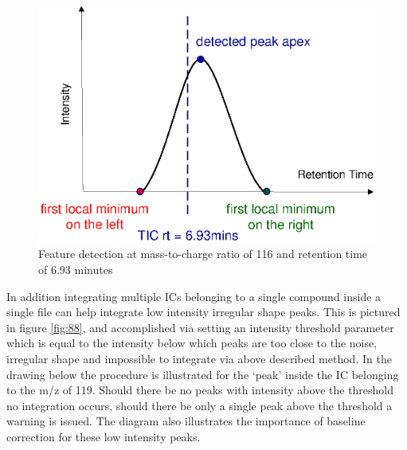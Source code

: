 \begin{figure}
  \begin{center}
    \includegraphics[scale=0.7]{graphics/chapter08/87.eps}
  \end{center}
  \caption{Feature detection at mass-to-charge ratio of 116 and retention time of 6.93 minutes}
  \label{fig:87}
\end{figure}

In addition integrating multiple ICs belonging to a single compound inside a 
single file can help integrate low intensity irregular shape peaks. This is 
pictured in figure \ref{fig:88}, and accomplished via setting an intensity 
threshold parameter which is equal to the intensity below which peaks are too 
close to the noise, irregular shape and impossible to integrate via above 
described method. In the drawing below the procedure is illustrated for the 
‘peak’ inside the IC belonging to the m/z of 119. Should there be no peaks with 
intensity above the threshold no integration occurs, should there be only a 
single peak above the threshold a warning is issued. The diagram also 
illustrates the importance of baseline correction for these low intensity peaks.


